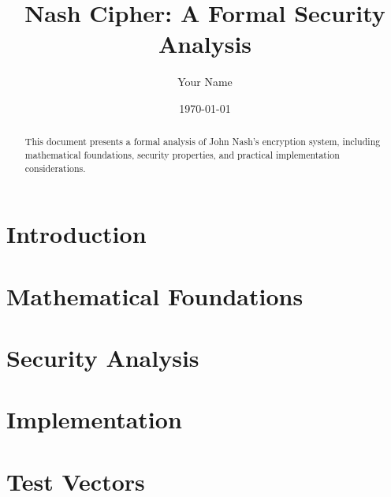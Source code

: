 \documentclass[12pt]{article}
\title{Nash Cipher: A Formal Security Analysis}
\author{Your Name}
\date{\today}
\begin{document}
\maketitle

\begin{abstract}
This document presents a formal analysis of John Nash's encryption system, including mathematical foundations, security properties, and practical implementation considerations.
\end{abstract}

\tableofcontents

\section{Introduction}


\section{Mathematical Foundations}


\section{Security Analysis}


\section{Implementation}


\section{Test Vectors}




\end{document}
